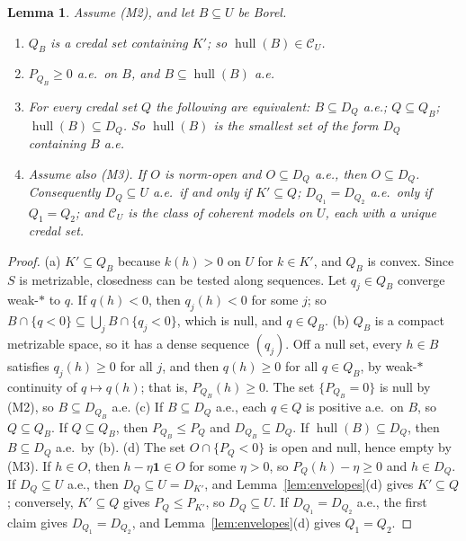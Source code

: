 \documentclass[11pt]{article}
\newcommand{\one}{\mathbf{1}}
\newcommand{\CC}{\mathcal{C}}
\newcommand{\hull}{\operatorname{hull}}
\theoremstyle{plain}
\newtheorem{lemma}[theorem]{Lemma}
\theoremstyle{definition}
\theoremstyle{remark}
\begin{document}
\begin{lemma}\label{lem:inf-hull}
Assume (M2), and let $B\subseteq U$ be Borel.
\begin{enumerate}[label=(\alph*)]
  \item $Q_B$ is a credal set containing $K'$; so $\hull(B)\in\CC_U$.
  \item $P_{Q_B}\ge0$ a.e.\ on $B$, and $B\subseteq\hull(B)$ a.e.
  \item For every credal set $Q$ the following are equivalent: $B\subseteq D_Q$ a.e.;
  $Q\subseteq Q_B$; $\hull(B)\subseteq D_Q$. So $\hull(B)$ is the smallest set of the form
  $D_Q$ containing $B$ a.e.
  \item Assume also (M3). If $O$ is norm-open and $O\subseteq D_Q$ a.e., then $O\subseteq
  D_Q$. Consequently $D_Q\subseteq U$ a.e.\ if and only if $K'\subseteq Q$; $D_{Q_1}=
  D_{Q_2}$ a.e.\ only if $Q_1=Q_2$; and $\CC_U$ is the class of coherent models on $U$,
  each with a unique credal set.
\end{enumerate}
\end{lemma}

\begin{proof}
(a) $K'\subseteq Q_B$ because $k(h)>0$ on $U$ for $k\in K'$, and $Q_B$ is convex. Since
$S$ is metrizable, closedness can be tested along sequences. Let $q_j\in Q_B$ converge
weak-$\ast$ to $q$. If $q(h)<0$, then $q_j(h)<0$ for some $j$; so $B\cap\{q<0\}\subseteq
\bigcup_jB\cap\{q_j<0\}$, which is null, and $q\in Q_B$.
(b) $Q_B$ is a compact metrizable space, so it has a dense sequence $(q_j)$. Off a null
set, every $h\in B$ satisfies $q_j(h)\ge0$ for all $j$, and then $q(h)\ge0$ for all
$q\in Q_B$, by weak-$\ast$ continuity of $q\mapsto q(h)$; that is, $P_{Q_B}(h)\ge0$. The
set $\{P_{Q_B}=0\}$ is null by (M2), so $B\subseteq D_{Q_B}$ a.e.
(c) If $B\subseteq D_Q$ a.e., each $q\in Q$ is positive a.e.\ on $B$, so $Q\subseteq Q_B$.
If $Q\subseteq Q_B$, then $P_{Q_B}\le P_Q$ and $D_{Q_B}\subseteq D_Q$. If $\hull(B)
\subseteq D_Q$, then $B\subseteq D_Q$ a.e.\ by (b).
(d) The set $O\cap\{P_Q<0\}$ is open and null, hence empty by (M3). If $h\in O$, then
$h-\eta\one\in O$ for some $\eta>0$, so $P_Q(h)-\eta\ge0$ and $h\in D_Q$. If $D_Q
\subseteq U$ a.e., then $D_Q\subseteq U=D_{K'}$, and Lemma~\ref{lem:envelopes}(d) gives
$K'\subseteq Q$; conversely, $K'\subseteq Q$ gives $P_Q\le P_{K'}$, so $D_Q\subseteq U$. If $D_{Q_1}=D_{Q_2}$
a.e., the first claim gives $D_{Q_1}=D_{Q_2}$, and Lemma~\ref{lem:envelopes}(d) gives
$Q_1=Q_2$.
\end{proof}
\end{document}
